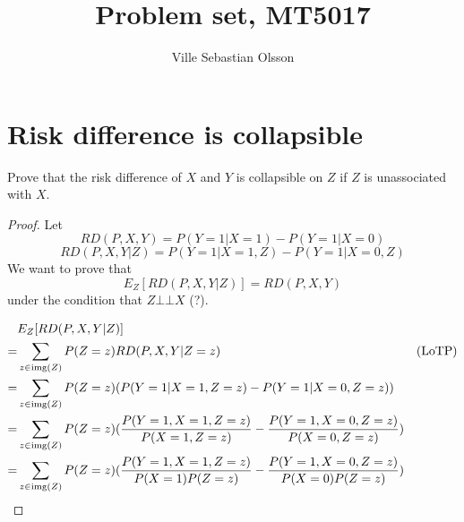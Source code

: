 \documentclass{article}
\title{Problem set, MT5017}
\author{Ville Sebastian Olsson}
\begin{document}
\maketitle
\tableofcontents

\section{Risk difference is collapsible}

Prove that the risk difference of \(X\) and \(Y\) is collapsible on \(Z\) if
\(Z\) is unassociated with \(X\).

\begin{proof}
Let
\[RD(P,X,Y) = P(Y=1|X=1)-P(Y=1|X=0)\]
\[RD(P,X,Y|Z) = P(Y=1|X=1,Z)-P(Y=1|X=0,Z)\]
We want to prove that
\[E_Z[RD(P,X,Y|Z)] = RD(P,X,Y)\]
under the condition that \(Z\bot\!\!\!\bot X\) (?).


\begin{align*}
	& E_Z[RD(P,X,Y|Z)] \\
	=& \sum_{z\in\operatorname{img}\left(Z\right)} P(Z=z)RD(P,X,Y|Z=z) & (\text{LoTP}) \\
	=& \sum_{z\in\operatorname{img}\left(Z\right)} P(Z=z)(P(Y=1|X=1,Z=z)-P(Y=1|X=0,Z=z)) \\
	=& \sum_{z\in\operatorname{img}\left(Z\right)} P(Z=z)(\frac{P(Y=1,X=1,Z=z)}{P(X=1,Z=z)}-\frac{P(Y=1,X=0,Z=z)}{P(X=0,Z=z)}) \\
	=& \sum_{z\in\operatorname{img}\left(Z\right)} P(Z=z)(\frac{P(Y=1,X=1,Z=z)}{P(X=1)P(Z=z)}-\frac{P(Y=1,X=0,Z=z)}{P(X=0)P(Z=z)}) \\
\end{align*}

\end{proof}
\end{document}
